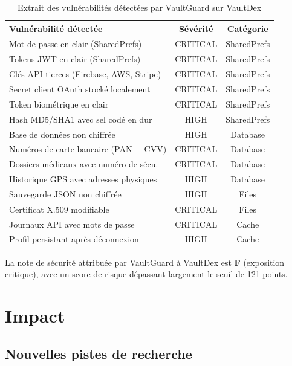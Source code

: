 \documentclass[preprint,12pt, a4paper]{elsarticle}
\begin{document}
\begin{table}[h]
\centering
\begin{tabular}{|p{5cm}|c|c|}
\hline
\textbf{Vulnérabilité détectée} & \textbf{Sévérité} & \textbf{Catégorie} \\
\hline
Mot de passe en clair (SharedPrefs) & CRITICAL & SharedPrefs \\
\hline
Tokens JWT en clair (SharedPrefs) & CRITICAL & SharedPrefs \\
\hline
Clés API tierces (Firebase, AWS, Stripe) & CRITICAL & SharedPrefs \\
\hline
Secret client OAuth stocké localement & CRITICAL & SharedPrefs \\
\hline
Token biométrique en clair & CRITICAL & SharedPrefs \\
\hline
Hash MD5/SHA1 avec sel codé en dur & HIGH & SharedPrefs \\
\hline
Base de données non chiffrée & HIGH & Database \\
\hline
Numéros de carte bancaire (PAN + CVV) & CRITICAL & Database \\
\hline
Dossiers médicaux avec numéro de sécu. & CRITICAL & Database \\
\hline
Historique GPS avec adresses physiques & HIGH & Database \\
\hline
Sauvegarde JSON non chiffrée & HIGH & Files \\
\hline
Certificat X.509 modifiable & CRITICAL & Files \\
\hline
Journaux API avec mots de passe & CRITICAL & Cache \\
\hline
Profil persistant après déconnexion & HIGH & Cache \\
\hline
\end{tabular}
\caption{Extrait des vulnérabilités détectées par VaultGuard sur VaultDex}
\label{tab:findings}
\end{table}

La note de sécurité attribuée par VaultGuard à VaultDex est \textbf{F} (exposition critique), avec un score de risque dépassant largement le seuil de 121 points.


\section{Impact}

\subsection{Nouvelles pistes de recherche}
\end{document}
